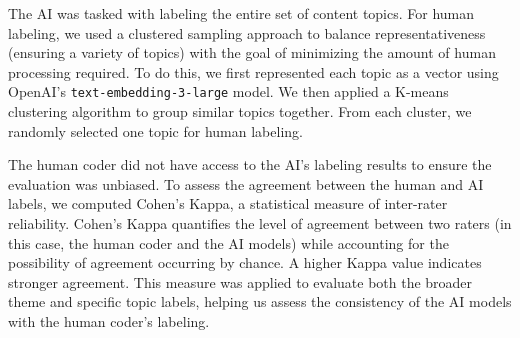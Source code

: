 \documentclass[]{interact}
\theoremstyle{plain}%
\theoremstyle{definition}
\theoremstyle{remark}
\begin{document}
The AI was tasked with labeling the entire set of content topics. For human labeling, we used a clustered sampling approach to balance representativeness (ensuring a variety of topics) with the goal of minimizing the amount of human processing required. To do this, we first represented each topic as a vector using OpenAI’s \texttt{text-embedding-3-large} model. We then applied a K-means clustering algorithm to group similar topics together. From each cluster, we randomly selected one topic for human labeling. 


The human coder did not have access to the AI's labeling results to ensure the evaluation was unbiased. To assess the agreement between the human and AI labels, we computed Cohen’s Kappa, a statistical measure of inter-rater reliability. Cohen’s Kappa quantifies the level of agreement between two raters (in this case, the human coder and the AI models) while accounting for the possibility of agreement occurring by chance. A higher Kappa value indicates stronger agreement. This measure was applied to evaluate both the broader theme and specific topic labels, helping us assess the consistency of the AI models with the human coder’s labeling.





\end{document}
